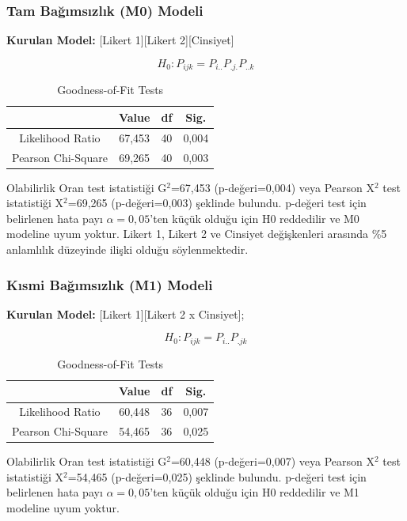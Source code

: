 \documentclass{article}
\begin{document}
\vspace{10pt}
\subsubsection{Tam Bağımsızlık (M0) Modeli}
\textbf{Kurulan Model:} [Likert 1][Likert 2][Cinsiyet]

$$H_0: P_{ijk} = P_{i..}P_{.j.}P_{..k}$$

\begin{table}[h]
    \centering
    \caption{Goodness-of-Fit Tests}
    \begin{tabular}{|c|c|c|c|}
         \hline
          & \textbf{Value} & \textbf{df} & \textbf{Sig.} \\
         \hline
         Likelihood Ratio & 67,453 & 40 & 0,004 \\
         Pearson Chi-Square & 69,265 & 40 & 0,003 \\
         \hline
    \end{tabular}
    \label{tab:goodness-of-fit}
\end{table}
Olabilirlik Oran test istatistiği G$^2$=67,453 (p-değeri=0,004) veya Pearson X$^2$ test istatistiği X$^2$=69,265 (p-değeri=0,003) şeklinde bulundu. p-değeri test için belirlenen hata payı $\alpha=0,05$'ten küçük olduğu için H0 reddedilir ve M0 modeline uyum yoktur. Likert 1, Likert 2 ve Cinsiyet değişkenleri arasında \%5 anlamlılık düzeyinde ilişki olduğu söylenmektedir.

\vspace{10pt}
\subsubsection{Kısmi Bağımsızlık (M1) Modeli}
\textbf{Kurulan Model:} [Likert 1][Likert 2 x Cinsiyet];

$$H_0: P_{ijk} = P_{i..}P_{.jk}$$

\begin{table}[h]
    \centering
    \caption{Goodness-of-Fit Tests}
    \begin{tabular}{|c|c|c|c|}
         \hline
          & \textbf{Value} & \textbf{df} & \textbf{Sig.} \\
         \hline
         Likelihood Ratio & 60,448 & 36 & 0,007 \\
         Pearson Chi-Square & 54,465 & 36 & 0,025 \\
         \hline
    \end{tabular}
    \label{tab:goodness-of-fit2}
\end{table}
Olabilirlik Oran test istatistiği G$^2$=60,448 (p-değeri=0,007) veya Pearson X$^2$ test istatistiği X$^2$=54,465 (p-değeri=0,025) şeklinde bulundu. p-değeri test için belirlenen hata payı $\alpha=0,05$'ten küçük olduğu için H0 reddedilir ve M1 modeline uyum yoktur.
\end{document}
